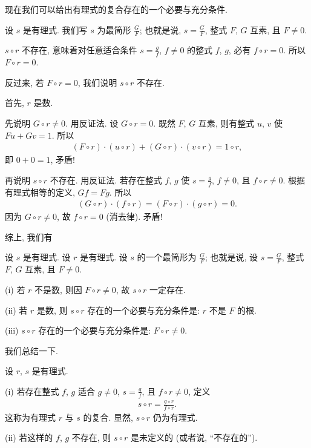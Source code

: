 现在我们可以给出有理式的复合存在的一个必要与充分条件.

设 $s$ 是有理式. 我们写 $s$ 为最简形 $\frac{G}{F}$; 也就是说, $s = \frac{G}{F}$, 整式 $F$, $G$ 互素, 且 $F \neq 0$.

$s \circ r$ 不存在, 意味着对任意适合条件 $s = \frac{g}{f}$, $f \neq 0$ 的整式 $f$, $g$, 必有 $f \circ r = 0$. 所以 $F \circ r = 0$.

反过来, 若 $F \circ r = 0$, 我们说明 $s \circ r$ 不存在.

首先, $r$ 是数.

先说明 $G \circ r \neq 0$. 用反证法. 设 $G \circ r = 0$. 既然 $F$, $G$ 互素, 则有整式 $u$, $v$ 使 $Fu + Gv = 1$. 所以
\begin{align*}
    (F \circ r) \cdot (u \circ r) + (G \circ r) \cdot (v \circ r) = 1 \circ r,
\end{align*}
即 $0 + 0 = 1$, 矛盾!

再说明 $s \circ r$ 不存在. 用反证法. 若存在整式 $f$, $g$ 使 $s = \frac{g}{f}$, $f \neq 0$, 且 $f \circ r \neq 0$. 根据有理式相等的定义, $Gf = Fg$. 所以
\begin{align*}
    (G \circ r) \cdot (f \circ r) = (F \circ r) \cdot (g \circ r) = 0.
\end{align*}
因为 $G \circ r \neq 0$, 故 $f \circ r = 0$ (消去律). 矛盾!

综上, 我们有
\begin{proposition}
    设 $s$ 是有理式. 设 $r$ 是有理式. 设 $s$ 的一个最简形为 $\frac{G}{F}$; 也就是说, 设 $s = \frac{G}{F}$, 整式 $F$, $G$ 互素, 且 $F \neq 0$.

    (i) 若 $r$ 不是数, 则因 $F \circ r \neq 0$, 故 $s \circ r$ 一定存在.

    (ii) 若 $r$ 是数, 则 $s \circ r$ 存在的一个必要与充分条件是: $r$ 不是 $F$ 的根.

    (iii) $s \circ r$ 存在的一个必要与充分条件是: $F \circ r \neq 0$.
\end{proposition}

我们总结一下.

\begin{definition}
    设 $r$, $s$ 是有理式.

    (i) 若存在整式 $f$, $g$ 适合 $g \neq 0$, $s = \frac{g}{f}$, 且 $f \circ r \neq 0$, 定义
    \begin{align*}
        s \circ r = \frac{g \circ r}{f \circ r}.
    \end{align*}
    这称为有理式 $r$ 与 $s$ 的复合. 显然, $s \circ r$ 仍为有理式.

    (ii) 若这样的 $f$, $g$ 不存在, 则 $s \circ r$ 是未定义的 (或者说, ``不存在的'').
\end{definition}

